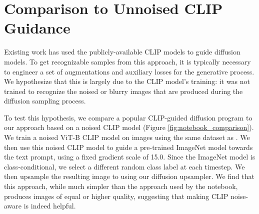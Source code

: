 \documentclass{article}
\begin{document}
\section{Comparison to Unnoised CLIP Guidance}
\label{app:unnoised_comp}

Existing work has used the publicly-available CLIP models to guide diffusion models. To get recognizable samples from this approach, it is typically necessary to engineer a set of augmentations and auxiliary losses for the generative process. We hypothesize that this is largely due to the CLIP model's training: it was not trained to recognize the noised or blurry images that are produced during the diffusion sampling process.

To test this hypothesis, we compare a popular CLIP-guided diffusion program \citep{clipdiff} to our approach based on a noised CLIP model (Figure \ref{fig:notebook_comparison}). We train a noised ViT-B CLIP model on  images using the same dataset as \citet{clip}. We then use this noised CLIP model to guide a pre-trained ImageNet model towards the text prompt, using a fixed gradient scale of 15.0. Since the ImageNet model is class-conditional, we select a different random class label at each timestep. We then upsample the resulting  image to  using our diffusion upsampler. We find that this approach, while much simpler than the approach used by the notebook, produces images of equal or higher quality, suggesting that making CLIP noise-aware is indeed helpful. 
\end{document}
